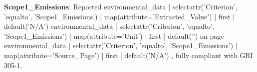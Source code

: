 \documentclass[a4paper,11pt]{article}
\begin{document}
{%
\textbf{Scope1_Emissions}: Reported {{ environmental_data | selectattr('Criterion', 'equalto', 'Scope1_Emissions') | map(attribute='Extracted_Value') | first | default('N/A') }} {{ environmental_data | selectattr('Criterion', 'equalto', 'Scope1_Emissions') | map(attribute='Unit') | first | default('') }} on page {{ environmental_data | selectattr('Criterion', 'equalto', 'Scope1_Emissions') | map(attribute='Source_Page') | first | default('N/A') }}, fully compliant with GRI 305-1.
{%

{%
{%

}}}}
\end{document}
